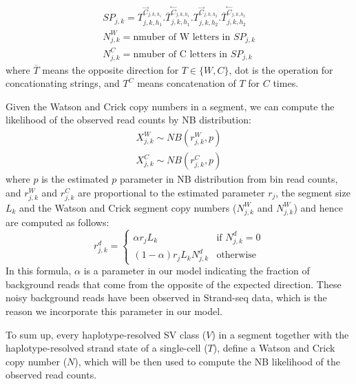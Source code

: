 \documentclass[12pt]{article}
\renewcommand{\j}{j} %
\newcommand{\CN}{C} %
\newcommand{\X}{X} %
\renewcommand{\k}{k} %
\newcommand{\h}{h} %
\newcommand{\T}{T} %
\newcommand{\V}{V} %
\newcommand{\N}{N} %
\begin{document}
\begin{align}
	SP_{\j,\k} = {\T^{\stackrel{\rightarrow}\CN_{\j,\k,\h_1}}_{\j, \k, \h_1}}.
				  {\overline{\T}^{\stackrel{\leftarrow}\CN_{\j,\k,\h_1}}_{\j, \k,\h_1}}.
				  \T^{\stackrel{\rightarrow}\CN_{\j,\k,\h_2}}_{\j, \k, \h_2}.
				  {\overline{\T}^{\stackrel{\leftarrow}\CN_{\j,\k,\h_2}}_{\j, \k,\h_2}}\nonumber\\
	\N_{\j, \k}^W = \text{nmuber of W letters in } SP_{\j,\k}\nonumber\\
	\N_{\j, \k}^C = \text{nmuber of C letters in } SP_{\j,\k}\nonumber
\end{align}
where $\overline{\T}$ means the opposite direction for $\T \in \{W, C\}$, dot is the operation for concationating strings, and $\T^C$ means concatenation of $\T$ for $C$ times.

Given the Watson and Crick copy numbers in a segment, we can compute the likelihood of the observed read counts by NB distribution:
\begin{align}
	\X_{\j,\k}^W \sim NB(r_{\j,\k}^W, p)\nonumber\\
	\X_{\j,\k}^C \sim NB(r_{\j,\k}^C, p)\nonumber
\end{align}
where $p$ is the estimated $p$ parameter in NB distribution from bin read counts, and $r_{\j,\k}^W$ and $r_{\j,\k}^C$ are proportional to the estimated parameter $r_\j$, the segment size $L_\k$ and the Watson and Crick segment copy numbers ($\N_{\j, \k}^W$ and $\N_{\j, \k}^W$) and hence are computed as follows:
\[
r_{\j,\k}^d = 
\begin{cases}
\alpha r_\j L_\k &\text{if } \N_{\j, \k}^d = 0 \\ 
(1- \alpha) r_\j L_\k \N_{\j, \k}^d &\text{otherwise}
\end{cases}
\]
In this formula, $\alpha$ is a parameter in our model indicating the fraction of background reads that come from the opposite of the expected direction. These noisy background reads have been observed in Strand-seq data, which is the reason we incorporate this parameter in our model.

To sum up, every haplotype-resolved SV class ($\V$) in a segment together with the haplotype-resolved strand state of a single-cell ($\T$), define a Watson and Crick copy number ($\N$), which will be then used to compute the NB likelihood of the observed read counts.
\end{document}
